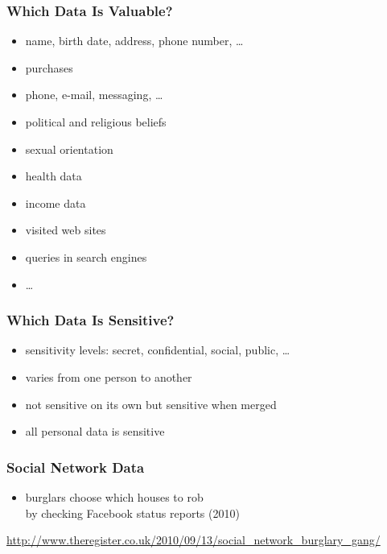 \documentclass[dvipsnames]{beamer}
\theoremstyle{plain}
\begin{document}
\begin{frame}
  \frametitle{Which Data Is Valuable?}

  \begin{itemize}
    \item name, birth date, address, phone number, \ldots
    \item purchases
    \item phone, e-mail, messaging, \ldots
    \item political and religious beliefs
    \item sexual orientation
    \item health data
    \item income data
    \item visited web sites
    \item queries in search engines
    \item \ldots
  \end{itemize}
\end{frame}

\begin{frame}
  \frametitle{Which Data Is Sensitive?}

  \begin{itemize}
    \item sensitivity levels: secret, confidential, social, public, \ldots
    \item varies from one person to another
    \item not sensitive on its own but sensitive when merged

    \bigskip
    \item all personal data is sensitive
  \end{itemize}
\end{frame}

\begin{frame}
  \frametitle{Social Network Data}

  \begin{itemize}
    \item burglars choose which houses to rob\\
      by checking Facebook status reports (2010)
  \end{itemize}

  \begin{center}
  \end{center}

  \medskip
  \tiny{\url{http://www.theregister.co.uk/2010/09/13/social_network_burglary_gang/}}\\
\end{frame}
\end{document}
